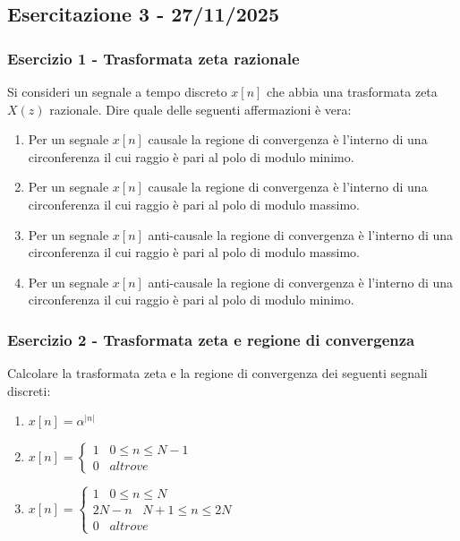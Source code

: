 \documentclass[../main.tex]{subfiles}
\begin{document}
\clearpage
\thispagestyle{empty}
\vspace*{7cm}
\subsection{Esercitazione 3 - 27/11/2025}
\vspace*{1.5cm}

\subsubsection{Esercizio 1 - Trasformata zeta razionale}

Si consideri un segnale a tempo discreto $x[n]$ che abbia una trasformata zeta
$X(z)$ razionale. Dire quale delle seguenti affermazioni è vera:

\begin{enumerate}
	\item[\textbf{1)}] Per un segnale $x[n]$ causale la regione di convergenza è l’interno di una circonferenza il cui raggio è pari al polo di modulo minimo.
	\item[\textbf{2)}] Per un segnale $x[n]$ causale la regione di convergenza è l’interno di una circonferenza il cui raggio è pari al polo di modulo massimo.
	\item[\textbf{3)}] Per un segnale $x[n]$ anti-causale la regione di convergenza è l’interno di una circonferenza il cui raggio è pari al polo di modulo massimo.
	\item[\textbf{4)}] Per un segnale $x[n]$ anti-causale la regione di convergenza è l’interno di una circonferenza il cui raggio è pari al polo di modulo minimo.
\end{enumerate}


\subsubsection{Esercizio 2 - Trasformata zeta e regione di convergenza}

Calcolare la trasformata zeta e la regione di convergenza dei seguenti segnali discreti:

\begin{enumerate}

	\item[\textbf{1)}] $x[n] = \alpha^{|n|}$
	\item[\textbf{2)}] $x[n] = \begin{cases}
		1 \hspace{10pt} 0 \leq n  \leq N-1 \\
		0 \hspace{10pt} \unit{altrove}
	\end{cases} $
	\item[\textbf{3)}] $x[n] = \begin{cases}
		1 \hspace{10pt} 0 \leq n  \leq N \\
		2N - n \hspace{10pt} N + 1 \leq n  \leq 2N \\
		0 \hspace{10pt} \unit{altrove}
	\end{cases} $
	
\end{enumerate}
\end{document}
